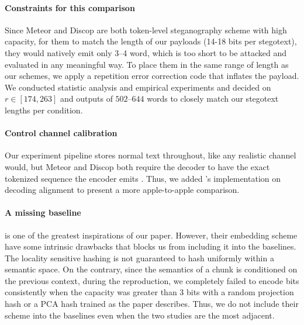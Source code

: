 \paragraph{Constraints for this comparison}
Since Meteor and Discop are both token-level steganography scheme with high capacity, for them to match the length of our payloads (14-18 bits per stegotext), they would natively emit only 3--4 word, which is too short to be attacked and evaluated in any meaningful way.
To place them in the same range of length as our schemes, we apply a repetition error correction code that inflates the payload.
We conducted statistic analysis and empirical experiments and decided on $r \in [174, 263]$ and outputs of $502$--$644$ words to closely match our stegotext lengths per condition.

\paragraph{Control channel calibration}
Our experiment pipeline stores normal text throughout, like any realistic channel would, but Meteor and Discop both require the decoder to have the exact tokenized sequence the encoder emits \citep{qi2024provably, wang2026retoksync}.
Thus, we added \citep{qi2024provably}'s implementation on decoding alignment to present a more apple-to-apple comparison.

\paragraph{A missing baseline}
\citet{perry2025robust} is one of the greatest inspirations of our paper.
However, their embedding scheme have some intrinsic drawbacks that blocks us from including it into the baselines.
The locality sensitive hashing is not guaranteed to hash uniformly within a semantic space.
On the contrary, since the semantics of a chunk is conditioned on the previous context, during the reproduction, we completely failed to encode bits consistently when the capacity was greater than 3 bits with a random projection hash or a PCA hash trained as the paper describes.
Thus, we do not include their scheme into the baselines even when the two studies are the most adjacent.


